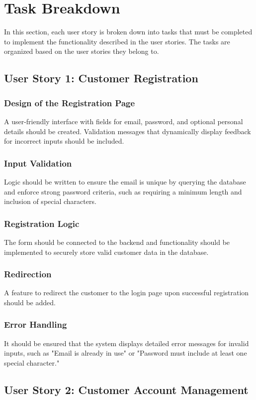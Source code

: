 \documentclass[twoside,a4paper,journal]{IEEEtran}
\begin{document}
\section{Task Breakdown}
In this section, each user story is broken down into tasks that must be
completed to implement the functionality described in the user stories.
The tasks are organized based on the user stories they belong to.

\subsection{User Story 1: Customer Registration}
\subsubsection{Design of the Registration Page}
A user-friendly interface with fields for email, password, and optional personal
details should be created.
Validation messages that dynamically display feedback for incorrect inputs
should be included.
\subsubsection{Input Validation}
Logic should be written to ensure the email is unique by querying the database
and enforce strong password criteria, such as requiring a minimum length and
inclusion of special characters.
\subsubsection{Registration Logic}
The form should be connected to the backend and functionality should be
implemented to securely store valid customer data in the database.
\subsubsection{Redirection}
A feature to redirect the customer to the login page upon successful
registration should be added.
\subsubsection{Error Handling}
It should be ensured that the system displays detailed error messages for
invalid inputs, such as
"Email is already in use" or
"Password must include at least one special character."

\subsection{User Story 2: Customer Account Management}
\end{document}
